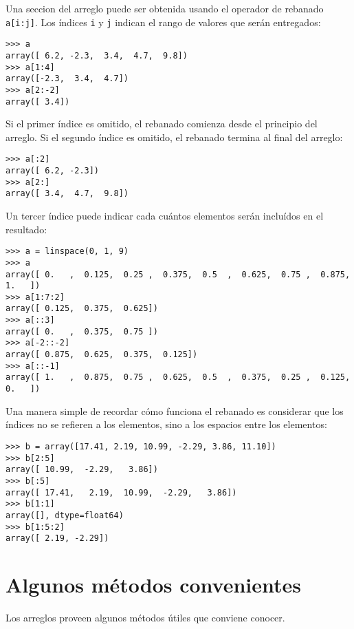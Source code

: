 Una seccion del arreglo puede ser obtenida usando el operador de
rebanado \lstinline!a[i:j]!. Los índices \lstinline!i! y \lstinline!j!
indican el rango de valores que serán entregados:

\begin{lstlisting}
>>> a
array([ 6.2, -2.3,  3.4,  4.7,  9.8])
>>> a[1:4]
array([-2.3,  3.4,  4.7])
>>> a[2:-2]
array([ 3.4])
\end{lstlisting}

Si el primer índice es omitido, el rebanado comienza desde el principio
del arreglo. Si el segundo índice es omitido, el rebanado termina al
final del arreglo:

\begin{lstlisting}
>>> a[:2]
array([ 6.2, -2.3])
>>> a[2:]
array([ 3.4,  4.7,  9.8])
\end{lstlisting}

Un tercer índice puede indicar cada cuántos elementos serán incluídos en
el resultado:

\begin{lstlisting}
>>> a = linspace(0, 1, 9)
>>> a
array([ 0.   ,  0.125,  0.25 ,  0.375,  0.5  ,  0.625,  0.75 ,  0.875,  1.   ])
>>> a[1:7:2]
array([ 0.125,  0.375,  0.625])
>>> a[::3]
array([ 0.   ,  0.375,  0.75 ])
>>> a[-2::-2]
array([ 0.875,  0.625,  0.375,  0.125])
>>> a[::-1]
array([ 1.   ,  0.875,  0.75 ,  0.625,  0.5  ,  0.375,  0.25 ,  0.125,  0.   ])
\end{lstlisting}

Una manera simple de recordar cómo funciona el rebanado es considerar
que los índices no se refieren a los elementos, sino a los espacios
entre los elementos:

\begin{center}
  
\end{center}

\begin{lstlisting}
>>> b = array([17.41, 2.19, 10.99, -2.29, 3.86, 11.10])
>>> b[2:5]
array([ 10.99,  -2.29,   3.86])
>>> b[:5]
array([ 17.41,   2.19,  10.99,  -2.29,   3.86])
>>> b[1:1]
array([], dtype=float64)
>>> b[1:5:2]
array([ 2.19, -2.29])
\end{lstlisting}

\section{Algunos métodos convenientes}

Los arreglos proveen algunos métodos útiles que conviene conocer.

